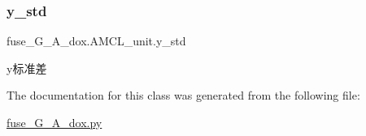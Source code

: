 \subsubsection{\texorpdfstring{y\+\_\+std}{y\_std}}
{\footnotesize\ttfamily fuse\+\_\+\+G\+\_\+\+A\+\_\+dox.\+A\+M\+C\+L\+\_\+unit.\+y\+\_\+std}



y标准差 



The documentation for this class was generated from the following file\+:\begin{DoxyCompactItemize}
\item 
\hyperlink{fuse___g___a__dox_8py}{fuse\+\_\+\+G\+\_\+\+A\+\_\+dox.\+py}\end{DoxyCompactItemize}
